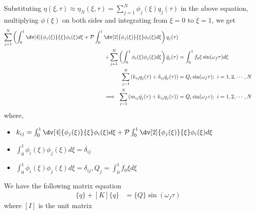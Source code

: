 Substituting $\eta (\xi, \tau) \approx \eta_N (\xi, \tau) = \sum_{j=1}^N \phi_j(\xi)q_j(\tau)$ in the above equation, multiplying $\phi (\xi)$ on both sides and integrating from $\xi = 0$ to $\xi = 1$, we get
\begin{align*}
\sum_{j=1}^N\left( \int_0^1 \dv[4]{\phi_j (\xi)}{\xi}\phi_i (\xi) d\xi + \mathcal{P}\int_0^1 \dv[2]{\phi_j (\xi)}{\xi}\phi_i (\xi) d\xi \right) q_j (\tau) &\\
~+ \sum_{j=1}^N\left(\int_0^1 \phi_i(\xi) \phi_j(\xi) d\xi\right) \ddot{q}_j(\tau) &= \int_0^1 f_0\xi \sin(\omega_f \tau) d\xi \\
\sum_{j=1}^N \left(k_{ij} q_j (\tau) + \delta_{ij} \ddot{q}_j(\tau) \right) &= Q_i \sin(\omega_f \tau);~ i=1,2, \cdots, N \\
\implies~\sum_{j=1}^N \left(m_{ij} \ddot{q}_j(\tau) + k_{ij} q_j (\tau)\right) &= Q_i \sin(\omega_f \tau);~ i=1,2, \cdots, N
\end{align*}
where, 
\begin{itemize}
	\item $k_{ij} = \int_0^1 \dv[4]{\phi_j (\xi)}{\xi}\phi_i (\xi) d\xi + \mathcal{P}\int_0^1 \dv[2]{\phi_j (\xi)}{\xi}\phi_i (\xi) d\xi$
	\item $\int_0^1 \phi_i(\xi) \phi_j(\xi) d\xi = \delta_{ij}$
	\item $\int_0^1 \phi_i(\xi) \phi_j(\xi) d\xi = \delta_{ij}, Q_j = \int_0^1 f_0\xi d\xi$
\end{itemize}
We have the following matrix equation
\begin{align}
[I]\{\ddot{q}\} + [K]\{q\} &= \{Q\}\sin(\omega_f \tau) \label{eqn:reduced-matrix-eqn-forced}
\end{align} 
where $[I]$ is the unit matrix
